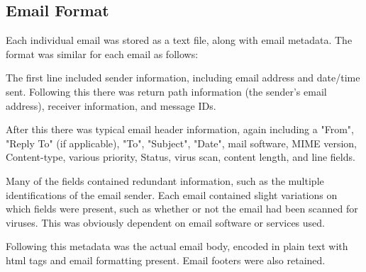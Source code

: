 \documentclass{article} %
\begin{document}
\subsection*{Email Format}
Each individual email was stored as a text file, along with email metadata. The format was similar for each email as follows:\par
The first line included sender information, including email address and date/time sent.
Following this there was return path information (the sender's email address), receiver information, and message IDs.\par
After this there was typical email header information, again including a "From", "Reply To" (if applicable), "To", "Subject", "Date", mail software, MIME version, Content-type, various priority, Status, virus scan, content length, and line fields.\par
Many of the fields contained redundant information, such as the multiple identifications of the email sender. Each email contained slight variations on which fields were present, such as whether or not the email had been scanned for viruses. This was obviously dependent on email software or services used.\par
Following this metadata was the actual email body, encoded in plain text with html tags and email formatting present. Email footers were also retained.
\end{document}
